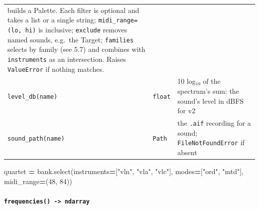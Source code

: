\documentclass[
  10pt,
]{article}
\newenvironment{Shaded}{\begin{snugshade}}{\end{snugshade}}
\newcommand{\DecValTok}[1]{\textcolor[rgb]{0.00,0.00,0.81}{#1}}
\newcommand{\NormalTok}[1]{#1}
\newcommand{\OperatorTok}[1]{\textcolor[rgb]{0.81,0.36,0.00}{\textbf{#1}}}
\newcommand{\StringTok}[1]{\textcolor[rgb]{0.31,0.60,0.02}{#1}}
\begin{document}
\begin{longtable}[]{@{}lll@{}}
\begin{minipage}[t]{0.30\columnwidth}\raggedright
builds a Palette. Each filter is optional and takes a list
or a single string; \texttt{midi\_range=(lo,\ hi)} is
inclusive; \texttt{exclude} removes named sounds, e.g.~the
Target; \texttt{families} selects by family (see 5.7) and
combines with \texttt{instruments} as an intersection.
Raises \texttt{ValueError} if nothing matches.\strut
\end{minipage}\tabularnewline
\begin{minipage}[t]{0.30\columnwidth}\raggedright
\texttt{level\_db(name)}\strut
\end{minipage} &
\begin{minipage}[t]{0.30\columnwidth}\raggedright
\texttt{float}\strut
\end{minipage} &
\begin{minipage}[t]{0.30\columnwidth}\raggedright
10 log₁₀ of the spectrum's sum: the sound's level in dBFS
for v2\strut
\end{minipage}\tabularnewline
\begin{minipage}[t]{0.30\columnwidth}\raggedright
\texttt{sound\_path(name)}\strut
\end{minipage} &
\begin{minipage}[t]{0.30\columnwidth}\raggedright
\texttt{Path}\strut
\end{minipage} &
\begin{minipage}[t]{0.30\columnwidth}\raggedright
the \texttt{.aif} recording for a sound;
\texttt{FileNotFoundError} if absent\strut
\end{minipage}\tabularnewline
\bottomrule
\end{longtable}

\begin{Shaded}
\begin{Highlighting}[]
\NormalTok{quartet }\OperatorTok{=}\NormalTok{ bank.select(instruments}\OperatorTok{=}\NormalTok{[}\StringTok{"vln"}\NormalTok{, }\StringTok{"vla"}\NormalTok{, }\StringTok{"vlc"}\NormalTok{],}
\NormalTok{                      modes}\OperatorTok{=}\NormalTok{[}\StringTok{"ord"}\NormalTok{, }\StringTok{"mtd"}\NormalTok{],}
\NormalTok{                      midi\_range}\OperatorTok{=}\NormalTok{(}\DecValTok{48}\NormalTok{, }\DecValTok{84}\NormalTok{))}
\end{Highlighting}
\end{Shaded}

\paragraph{\texorpdfstring{\texttt{frequencies()\ -\textgreater{}\ ndarray}}{frequencies() -\textgreater{} ndarray}}
\end{document}
